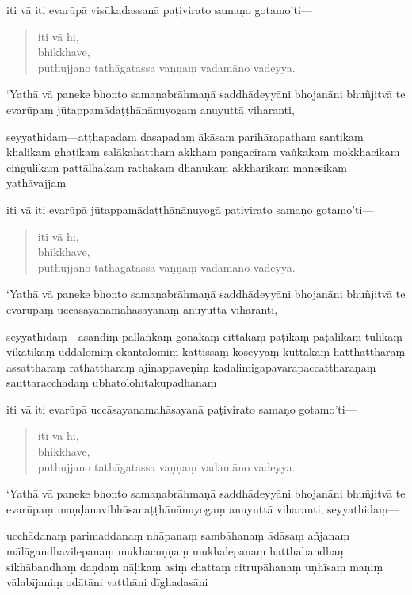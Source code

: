 \documentclass[11pt,twoside,openright]{book}
\begin{document}
\pstart
iti vā iti evarūpā visūkadassanā paṭivirato samaṇo gotamo’ti—
\pend

\begin{verse}
iti vā hi,\\
\vin  bhikkhave,\\
\vin  puthujjano tathāgatassa vaṇṇaṃ vadamāno vadeyya.

\end{verse}
\pstart
‘Yathā vā paneke bhonto samaṇabrāhmaṇā saddhādeyyāni bhojanāni bhuñjitvā te evarūpaṃ jūtappamādaṭṭhānānuyogaṃ anuyuttā viharanti,
\pend

\pstart
seyyathidaṃ—aṭṭhapadaṃ dasapadaṃ ākāsaṃ parihārapathaṃ santikaṃ khalikaṃ ghaṭikaṃ salākahatthaṃ akkhaṃ paṅgacīraṃ vaṅkakaṃ mokkhacikaṃ ciṅgulikaṃ pattāḷhakaṃ rathakaṃ dhanukaṃ akkharikaṃ manesikaṃ yathāvajjaṃ
\pend

\pstart
iti vā iti evarūpā jūtappamādaṭṭhānānuyogā paṭivirato samaṇo gotamo’ti—
\pend

\begin{verse}
iti vā hi,\\
\vin  bhikkhave,\\
\vin  puthujjano tathāgatassa vaṇṇaṃ vadamāno vadeyya.

\end{verse}
\pstart
‘Yathā vā paneke bhonto samaṇabrāhmaṇā saddhādeyyāni bhojanāni bhuñjitvā te evarūpaṃ uccāsayanamahāsayanaṃ anuyuttā viharanti,
\pend

\pstart
seyyathidaṃ—āsandiṃ pallaṅkaṃ gonakaṃ cittakaṃ paṭikaṃ paṭalikaṃ tūlikaṃ vikatikaṃ uddalomiṃ ekantalomiṃ kaṭṭissaṃ koseyyaṃ kuttakaṃ hatthattharaṃ assattharaṃ rathattharaṃ ajinappaveṇiṃ kadalimigapavarapaccattharaṇaṃ sauttaracchadaṃ ubhatolohitakūpadhānaṃ
\pend

\pstart
iti vā iti evarūpā uccāsayanamahāsayanā paṭivirato samaṇo gotamo’ti—
\pend

\begin{verse}
iti vā hi,\\
\vin  bhikkhave,\\
\vin  puthujjano tathāgatassa vaṇṇaṃ vadamāno vadeyya.

\end{verse}
\pstart
‘Yathā vā paneke bhonto samaṇabrāhmaṇā saddhādeyyāni bhojanāni bhuñjitvā te evarūpaṃ maṇḍanavibhūsanaṭṭhānānuyogaṃ anuyuttā viharanti, seyyathidaṃ—
\pend

\pstart
ucchādanaṃ parimaddanaṃ nhāpanaṃ sambāhanaṃ ādāsaṃ añjanaṃ mālāgandhavilepanaṃ mukhacuṇṇaṃ mukhalepanaṃ hatthabandhaṃ sikhābandhaṃ daṇḍaṃ nāḷikaṃ asiṃ chattaṃ citrupāhanaṃ uṇhīsaṃ maṇiṃ vālabījaniṃ odātāni vatthāni dīghadasāni
\pend
\end{document}
